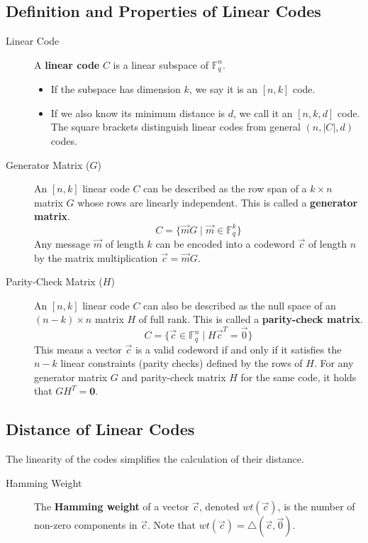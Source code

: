 \subsection{Definition and Properties of Linear Codes}

\begin{description}
    \item[Linear Code] A \textbf{linear code} $C$ is a linear subspace of $\mathbb{F}_q^n$.
    \begin{itemize}
        \item If the subspace has dimension $k$, we say it is an $[n, k]$ code.
        \item If we also know its minimum distance is $d$, we call it an $[n, k, d]$ code. The square brackets distinguish linear codes from general $(n, |C|, d)$ codes.
    \end{itemize}

    \item[Generator Matrix ($G$)] An $[n, k]$ linear code $C$ can be described as the row span of a $k \times n$ matrix $G$ whose rows are linearly independent. This is called a \textbf{generator matrix}.
    \[
        C = \{ \vec{m}G \mid \vec{m} \in \mathbb{F}_q^k \}
    \]
    Any message $\vec{m}$ of length $k$ can be encoded into a codeword $\vec{c}$ of length $n$ by the matrix multiplication $\vec{c} = \vec{m}G$.

    \item[Parity-Check Matrix ($H$)] An $[n, k]$ linear code $C$ can also be described as the null space of an $(n-k) \times n$ matrix $H$ of full rank. This is called a \textbf{parity-check matrix}.
    \[
        C = \{ \vec{c} \in \mathbb{F}_q^n \mid H\vec{c}^T = \vec{0} \}
    \]
    This means a vector $\vec{c}$ is a valid codeword if and only if it satisfies the $n-k$ linear constraints (parity checks) defined by the rows of $H$. For any generator matrix $G$ and parity-check matrix $H$ for the same code, it holds that $GH^T = \mathbf{0}$.
\end{description}

\subsection{Distance of Linear Codes}

The linearity of the codes simplifies the calculation of their distance.

\begin{description}
    \item[Hamming Weight] The \textbf{Hamming weight} of a vector $\vec{c}$, denoted $wt(\vec{c})$, is the number of non-zero components in $\vec{c}$. Note that $wt(\vec{c}) = \triangle(\vec{c}, \vec{0})$.
\end{description}

